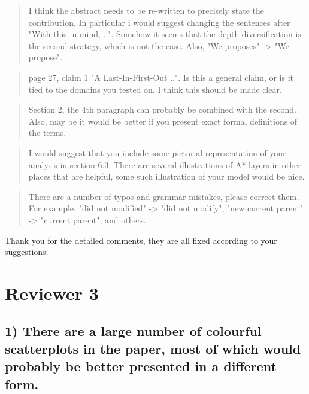 \documentclass{article}
\begin{document}
\begin{quote}
 I think the abstract needs to be re-written to precisely state the
contribution. In particular i would suggest changing the sentences
after "With this in mind, ..". Somehow it seems that the depth
diversification is the second strategy, which is not the case. Also,
"We proposes" -> "We propose".
\end{quote}

\begin{quote}
 page 27, claim 1 "A Last-In-First-Out ..". Is this a general claim,
or is it tied to the domains you tested on. I think this should be
made clear.
\end{quote}

\begin{quote}
 Section 2, the 4th paragraph can probably be combined with the
second. Also, may be it would be better if you present exact formal
definitions of the terms.
\end{quote}

\begin{quote}
 I would suggest that you include some pictorial representation of
your analysis in section 6.3. There are several illustrations of A*
layers in other places that are helpful, some such illustration of
your model would be nice.
\end{quote}

\begin{quote}
 There are a number of typos and grammar mistakes, please correct
them. For example, "did not modified" -> "did not modify", "new
current parent" -> "current parent", and others.
\end{quote}

Thank you for the detailed comments, they are all fixed according to your suggestions.
\section{Reviewer 3}
\label{sec:orgheadline33}

\subsection{1) There are a large number of colourful scatterplots in the paper, most of which would probably be better presented in a different form.}
\label{sec:orgheadline25}
\end{document}

